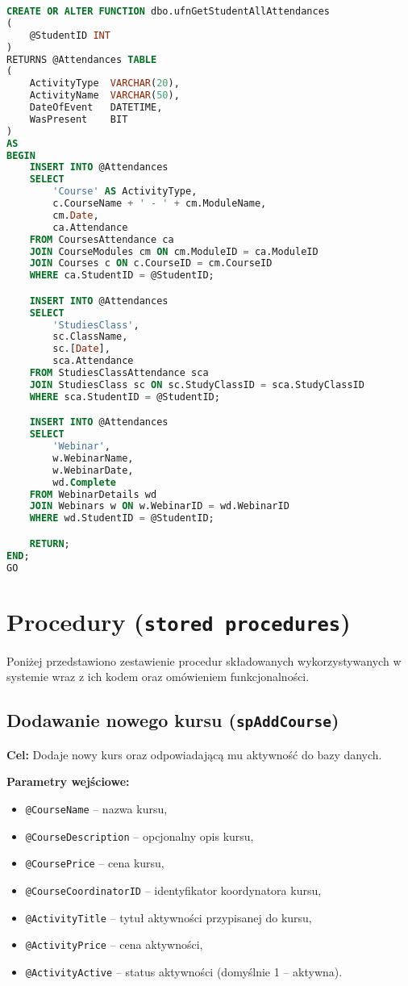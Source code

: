 \documentclass[12pt]{article}
\begin{document}
 
\begin{lstlisting}[language=SQL]
CREATE OR ALTER FUNCTION dbo.ufnGetStudentAllAttendances
(
    @StudentID INT
)
RETURNS @Attendances TABLE
(
    ActivityType  VARCHAR(20),
    ActivityName  VARCHAR(50),
    DateOfEvent   DATETIME,
    WasPresent    BIT
)
AS
BEGIN
    INSERT INTO @Attendances
    SELECT 
        'Course' AS ActivityType,
        c.CourseName + ' - ' + cm.ModuleName,
        cm.Date,
        ca.Attendance
    FROM CoursesAttendance ca
    JOIN CourseModules cm ON cm.ModuleID = ca.ModuleID
    JOIN Courses c ON c.CourseID = cm.CourseID
    WHERE ca.StudentID = @StudentID;

    INSERT INTO @Attendances
    SELECT
        'StudiesClass',
        sc.ClassName,
        sc.[Date],
        sca.Attendance
    FROM StudiesClassAttendance sca
    JOIN StudiesClass sc ON sc.StudyClassID = sca.StudyClassID
    WHERE sca.StudentID = @StudentID;

    INSERT INTO @Attendances
    SELECT
        'Webinar',
        w.WebinarName,
        w.WebinarDate,
        wd.Complete
    FROM WebinarDetails wd
    JOIN Webinars w ON w.WebinarID = wd.WebinarID
    WHERE wd.StudentID = @StudentID;

    RETURN;
END;
GO
\end{lstlisting}


\newpage
\section{Procedury (\texttt{stored procedures})}
Poniżej przedstawiono zestawienie procedur składowanych wykorzystywanych w systemie wraz z ich kodem oraz omówieniem funkcjonalności.

\subsection{Dodawanie nowego kursu (\texttt{spAddCourse})}
\textbf{Cel:} Dodaje nowy kurs oraz odpowiadającą mu aktywność do bazy danych.

\textbf{Parametry wejściowe:}
\begin{itemize}
  \item \texttt{@CourseName} – nazwa kursu,
  \item \texttt{@CourseDescription} – opcjonalny opis kursu,
  \item \texttt{@CoursePrice} – cena kursu,
  \item \texttt{@CourseCoordinatorID} – identyfikator koordynatora kursu,
  \item \texttt{@ActivityTitle} – tytuł aktywności przypisanej do kursu,
  \item \texttt{@ActivityPrice} – cena aktywności,
  \item \texttt{@ActivityActive} – status aktywności (domyślnie 1 – aktywna).
\end{itemize}
\end{document}

